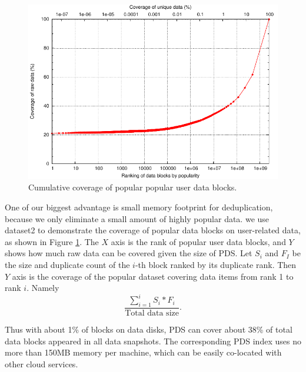 \begin{figure}
\centering
\includegraphics[width=5in]{images/ay41a_big_data_disk_cdf.pdf}
\caption{Cumulative  coverage of popular popular user data blocks.}
\label{fig:userdatacoverage}
\end{figure}

One of our biggest advantage is small memory footprint for deduplication, because we only
eliminate a small amount of highly popular data.
we use dataset2 to demonstrate the coverage of popular data blocks on user-related data, 
as shown in Figure \ref{fig:userdatacoverage}.
The $X$ axis is the rank of popular user data blocks, and $Y$ shows how much raw data can be covered given
the size of PDS.
Let $S_i$ and $F_I$ be the size and duplicate count 
of the $i$-th block ranked by its duplicate rank.  Then $Y$ axis is the coverage of
the popular dataset covering data items from rank 1 to rank $i$. Namely  
\[
\frac{ \sum_{i=1}^{i} S_i * F_i} {\mbox{Total data size}}.
\]

Thus with about 1\% of blocks on data disks, PDS can cover about 38\% of total data blocks
appeared in all data snapshots. The corresponding PDS index uses no more than 150MB memory per machine,
which can be easily co-located with other cloud services.


